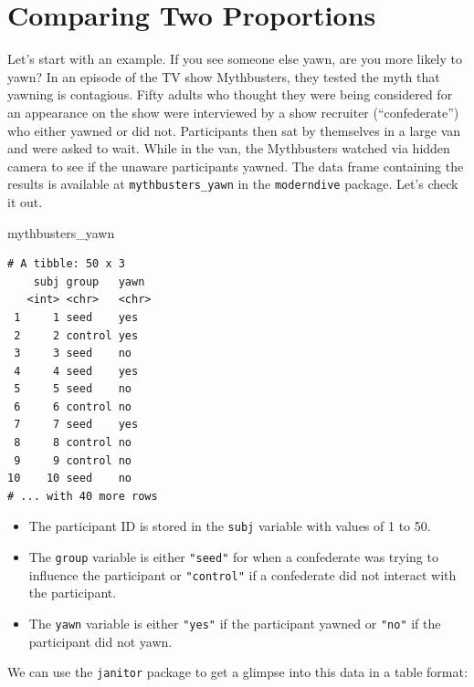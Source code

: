 \documentclass[]{article}
\newenvironment{Shaded}{\begin{snugshade}}{\end{snugshade}}
\newcommand{\KeywordTok}[1]{\textcolor[rgb]{0.13,0.29,0.53}{\textbf{#1}}}
\newcommand{\StringTok}[1]{\textcolor[rgb]{0.31,0.60,0.02}{#1}}
\newcommand{\CommentTok}[1]{\textcolor[rgb]{0.56,0.35,0.01}{\textit{#1}}}
\newcommand{\OperatorTok}[1]{\textcolor[rgb]{0.81,0.36,0.00}{\textbf{#1}}}
\newcommand{\NormalTok}[1]{#1}
\providecommand{\tightlist}{%
  \setlength{\itemsep}{0pt}\setlength{\parskip}{0pt}}
\begin{document}
\section{Comparing Two Proportions}\label{comparing-two-proportions}

Let's start with an example. If you see someone else yawn, are you more
likely to yawn? In an episode of the TV show Mythbusters, they tested
the myth that yawning is contagious. Fifty adults who thought they were
being considered for an appearance on the show were interviewed by a
show recruiter (``confederate'') who either yawned or did not.
Participants then sat by themselves in a large van and were asked to
wait. While in the van, the Mythbusters watched via hidden camera to see
if the unaware participants yawned. The data frame containing the
results is available at \texttt{mythbusters\_yawn} in the
\texttt{moderndive} package. Let's check it out.

\begin{Shaded}
\begin{Highlighting}[]
\NormalTok{mythbusters_yawn}
\end{Highlighting}
\end{Shaded}

\begin{verbatim}
# A tibble: 50 x 3
    subj group   yawn 
   <int> <chr>   <chr>
 1     1 seed    yes  
 2     2 control yes  
 3     3 seed    no   
 4     4 seed    yes  
 5     5 seed    no   
 6     6 control no   
 7     7 seed    yes  
 8     8 control no   
 9     9 control no   
10    10 seed    no   
# ... with 40 more rows
\end{verbatim}

\begin{itemize}
\tightlist
\item
  The participant ID is stored in the \texttt{subj} variable with values
  of 1 to 50.
\item
  The \texttt{group} variable is either \texttt{"seed"} for when a
  confederate was trying to influence the participant or
  \texttt{"control"} if a confederate did not interact with the
  participant.
\item
  The \texttt{yawn} variable is either \texttt{"yes"} if the participant
  yawned or \texttt{"no"} if the participant did not yawn.
\end{itemize}

We can use the \texttt{janitor} package to get a glimpse into this data
in a table format:

\begin{Shaded}
\end{Shaded}
\end{document}
